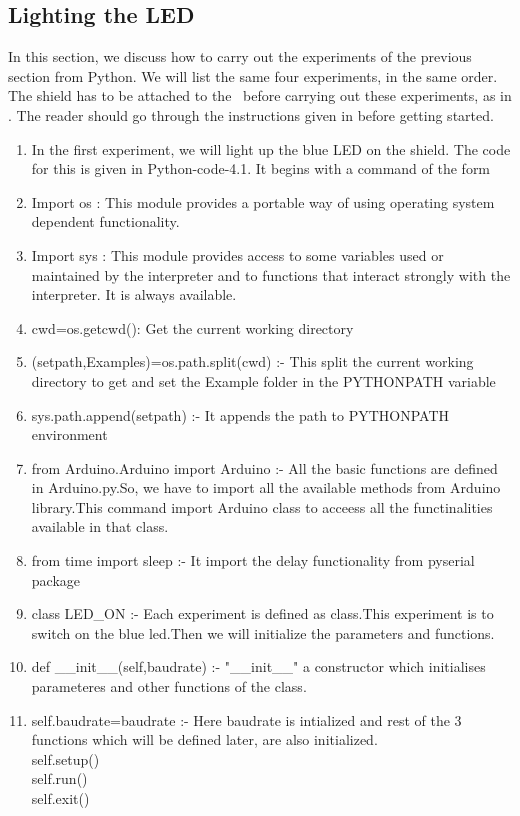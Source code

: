 \subsection{Lighting the LED}
\label{sec:light-py}
In this section, we discuss how to carry out the experiments of the
previous section from Python.  We will list the same four experiments,
in the same order.  The shield has to be attached to the \arduino\
before carrying out these experiments, as in .
The reader should go through the instructions given in
 before getting started.
\begin{enumerate}
\item In the first experiment, we will light up the blue LED on the
  shield.  The code for this is given in Python-code-4.1.
    It begins with a command of the form
\item Import os : This module provides a portable way of using operating system dependent functionality.
\item Import sys : This module provides access to some variables used or maintained by the interpreter 
and to functions that interact strongly with the interpreter. It is always available.
\item cwd=os.getcwd(): Get the current working directory 
\item (setpath,Examples)=os.path.split(cwd) :- This split the current working directory to get and set the Example folder in the PYTHONPATH variable
\item sys.path.append(setpath) :- It appends the path to PYTHONPATH environment 
\item from Arduino.Arduino import Arduino :- All the basic functions are defined in Arduino.py.So, we have to import all the available methods from Arduino library.This command import Arduino class to acceess all the functinalities available in that class.
\item from time import sleep :- It import the delay functionality from pyserial package
\item class LED\_ON :- Each experiment is defined as class.This experiment 
is to switch on the blue led.Then we will initialize the parameters and functions.
\item def \_\_init\_\_(self,baudrate) :- "\_\_init\_\_" a constructor which initialises parameteres and other functions of the class.
\item self.baudrate=baudrate :- Here baudrate is intialized and rest of the  3 functions which will be defined later, are also initialized.\\
   self.setup() \\
   self.run()   \\
   self.exit()  \\


\end{enumerate}
